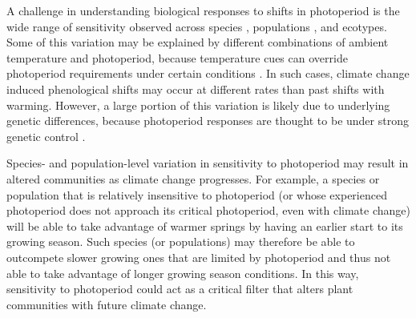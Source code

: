 \documentclass{article}
\begin{document}
\par A challenge in understanding biological responses to shifts in photoperiod is the wide range of sensitivity observed across species \citep{Sanz-Perez:2009aa, zohner2016,flynn2018}, populations \citep{tanino2010}, and ecotypes\citep{Howe:1995aa}. Some of this variation may be explained by different combinations of ambient temperature and photoperiod, because temperature cues can override photoperiod requirements under certain conditions \citep [at least during growth cessation][] {tanino2010}. In such cases, climate change induced phenological shifts may occur at different rates than past shifts with warming. However, a large portion of this variation is likely due to underlying genetic differences, because photoperiod responses are thought to be under strong genetic control \cite{bradshaw1995,weih2004,keller2011}. 
\par Species- and population-level variation in sensitivity to photoperiod may result in altered communities as climate change progresses. For example, a species or population that is relatively insensitive to photoperiod (or whose experienced photoperiod does not approach its critical photoperiod, even with climate change) will be able to take advantage of warmer springs by having an earlier start to its growing season. Such species (or populations) may therefore be able to outcompete slower growing ones that are limited by photoperiod and thus not able to take advantage of longer growing season conditions. In this way, sensitivity to photoperiod could act as a critical filter that alters plant communities with future climate change. 

\end{document}
